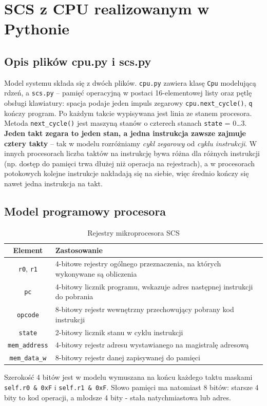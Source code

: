 \documentclass[11pt,a4paper]{article}
\newcommand{\kod}[1]{\texttt{#1}}
\begin{document}
\section{SCS z CPU realizowanym w Pythonie}

\subsection{Opis plików cpu.py i scs.py}
Model systemu składa się z dwóch plików. \kod{cpu.py} zawiera klasę \kod{Cpu}
modelującą rdzeń, a \kod{scs.py} -- pamięć operacyjną w postaci 16-elementowej listy
oraz pętlę obsługi klawiatury: spacja podaje jeden impuls zegarowy
\kod{cpu.next\_cycle()}, \kod{q} kończy program. Po każdym takcie wypisywana jest
linia ze stanem procesora. Metoda \kod{next\_cycle()} jest maszyną stanów o czterech stanach \kod{state}
= 0\ldots3. \textbf{Jeden takt zegara to jeden stan, a jedna instrukcja zawsze
zajmuje cztery takty} -- tak w modelu rozróżniamy \textit{cykl zegarowy} od
\textit{cyklu instrukcji}. W innych procesorach liczba taktów na instrukcję
bywa różna dla różnych instrukcji (np. dostęp do pamięci trwa dłużej niż operacja
na rejestrach), a w procesorach potokowych kolejne instrukcje nakładają się na
siebie, więc średnio kończy się nawet jedna instrukcja na takt.

\subsection{Model programowy procesora}
\begin{table}[H]
    \centering
    \begin{tabular}{|c|p{}|}
        \hline
        \rowcolor{gray!25} Element & Zastosowanie \\ \hline
        \kod{r0}, \kod{r1} & 4-bitowe rejestry ogólnego przeznaczenia, na których wykonywane są obliczenia \\ \hline
        \kod{pc} & 4-bitowy licznik programu, wskazuje adres następnej instrukcji do pobrania \\ \hline
        \kod{opcode} & 8-bitowy rejestr wewnętrzny przechowujący pobrany kod instrukcji  \\ \hline
        \kod{state} & 2-bitowy licznik stanu w cyklu instrukcji \\ \hline
        \kod{mem\_address} & 4-bitowy rejestr adresu wystawianego na magistralę adresową \\ \hline
        \kod{mem\_data\_w} & 8-bitowy rejestr danej zapisywanej do pamięci \\ \hline
    \end{tabular}
    \caption{Rejestry mikroprocesora SCS}
    \label{tab:rejestry}
\end{table}
Szerokość 4 bitów jest w modelu wymuszana na końcu każdego taktu maskami
\kod{self.r0 \& 0xF} i \kod{self.r1 \& 0xF}. Słowo pamięci ma natomiast 8 bitów:
starsze 4 bity to kod operacji, a młodsze 4 bity - stała natychmiastowa lub adres.
\end{document}
